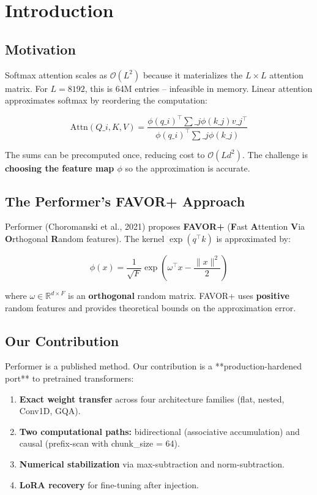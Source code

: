
\section{Introduction}

\subsection{Motivation}

Softmax attention scales as $\mathcal{O}(L^2)$ because it materializes the 
$L \times L$ attention matrix. For $L = 8192$, this is 64M entries -- 
infeasible in memory. Linear attention approximates softmax by reordering 
the computation:

\[
\text{Attn}(Q\_i, K, V) = \frac{\phi(q\_i)^\top \sum\_j \phi(k\_j) v\_j^\top}{\phi(q\_i)^\top \sum\_j \phi(k\_j)}
\tag{1.1}
\]

The sums can be precomputed once, reducing cost to $\mathcal{O}(L d^2)$. The 
challenge is \textbf{choosing the feature map $\phi$} so the approximation is 
accurate.

\subsection{The Performer's FAVOR+ Approach}

Performer (Choromanski et al., 2021) proposes \textbf{FAVOR+} (\textbf{F}ast 
\textbf{A}ttention \textbf{V}ia \textbf{O}rthogonal \textbf{R}andom features). The kernel 
$\exp(q^\top k)$ is approximated by:

\[
\phi(x) = \frac{1}{\sqrt{F}} \exp\!\left(\omega^\top x - \frac{\|x\|^2}{2}\right)
\tag{1.2}
\]

where $\omega \in \mathbb{R}^{d \times F}$ is an \textbf{orthogonal} random 
matrix. FAVOR+ uses \textbf{positive} random features and provides theoretical 
bounds on the approximation error.

\subsection{Our Contribution}

Performer is a published method. Our contribution is a **production-hardened 
port** to pretrained transformers:

\begin{enumerate}
\item \textbf{Exact weight transfer} across four architecture families (flat,
  nested, Conv1D, GQA).
\item \textbf{Two computational paths:} bidirectional (associative accumulation)
  and causal (prefix-scan with chunk\_size = 64).
\item \textbf{Numerical stabilization} via max-subtraction and norm-subtraction.
\item \textbf{LoRA recovery} for fine-tuning after injection.

\end{enumerate}
